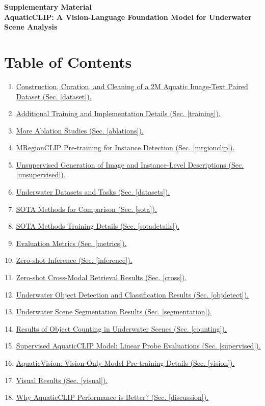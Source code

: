 

\newpage
\huge
\textbf{Supplementary Material \\ AquaticCLIP: A Vision-Language Foundation Model for Underwater Scene Analysis}
\normalsize

\section*{Table of Contents}
\begin{enumerate}
    \item  \href{dataset}{Construction, Curation, and Cleaning of a 2M Aquatic Image-Text Paired Dataset (Sec. \ref{dataset}).}
    \item  \href{training}{Additional Training and Implementation Details (Sec. \ref{training}).}
    \item  \href{ablations}{More Ablation Studies (Sec. \ref{ablations}).}
    \item  \href{mrgionclip}{MRegionCLIP Pre-training for Instance Detection (Sec. \ref{mrgionclip}).}
    \item  \href{unsupervised}{Unsupervised Generation of Image and Instance-Level Descriptions (Sec. \ref{unsupervised}).}
    \item  \href{datasets}{Underwater Datasets and Tasks (Sec. \ref{datasets}).}
    \item  \href{sota}{SOTA Methods for Comparison (Sec. \ref{sota}).}
    \item  \href{sotadetails}{SOTA Methods Training Details (Sec. \ref{sotadetails}).}
    \item  \href{metrics}{Evaluation Metrics (Sec. \ref{metrics}).}
    \item  \href{inference}{Zero-shot Inference (Sec. \ref{inference}).}
    \item  \href{cross}{Zero-shot Cross-Modal Retrieval Results (Sec. \ref{cross}).}
    \item  \href{objdetect}{Underwater Object Detection and Classification Results (Sec. \ref{objdetect}).}
    \item  \href{segmentation}{Underwater Scene Segmentation Results (Sec. \ref{segmentation}).}
    \item  \href{counting}{Results of Object Counting in Underwater Scenes (Sec. \ref{counting}).}
    \item  \href{supervised}{Supervised AquaticCLIP Model: Linear Probe Evaluations (Sec. \ref{supervised}).}
    \item  \href{vision}{AquaticVision: Vision-Only Model Pre-training Details (Sec. \ref{vision}).}
    \item  \href{visual}{ Visual Results (Sec. \ref{visual}).}
    \item  \href{discussion}{Why AquaticCLIP Performance is Better? (Sec. \ref{discussion}).}    
\end{enumerate}

